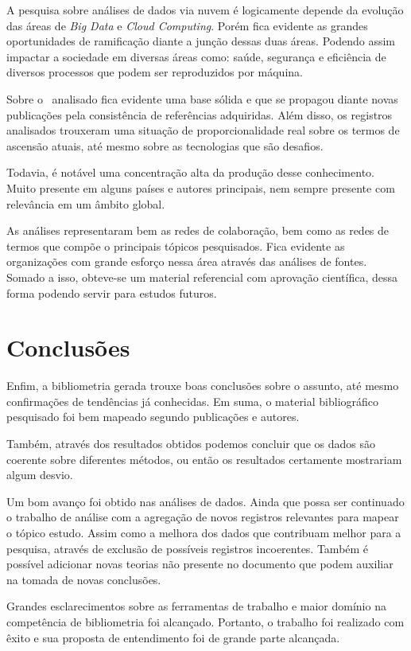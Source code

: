 A pesquisa sobre análises de dados via nuvem é logicamente depende da evolução das áreas de \textit{Big Data} e \textit{Cloud Computing}. Porém fica evidente as grandes oportunidades de ramificação diante a junção dessas duas áreas. Podendo assim impactar a sociedade em diversas áreas como: saúde, segurança e eficiência de diversos processos que podem ser reproduzidos por máquina.

Sobre o \dataset\ analisado fica evidente uma base sólida e que se propagou diante novas publicações pela consistência de referências adquiridas. Além disso, os registros analisados trouxeram uma situação de proporcionalidade real sobre os termos de ascensão atuais, até mesmo sobre as tecnologias que são desafios.

Todavia, é notável uma concentração alta da produção desse conhecimento. Muito presente em alguns países e autores principais, nem sempre presente com relevância em um âmbito global.

As análises representaram bem as redes de colaboração, bem como as redes de termos que compõe o principais tópicos pesquisados. Fica evidente as organizações com grande esforço nessa área através das análises de fontes. Somado a isso, obteve-se um material referencial com aprovação científica, dessa forma podendo servir para estudos futuros.

\section{Conclusões}

Enfim, a bibliometria gerada trouxe boas conclusões sobre o assunto, até mesmo confirmações de tendências já conhecidas. Em suma, o material bibliográfico pesquisado foi bem mapeado segundo publicações e autores.

Também, através dos resultados obtidos podemos concluir que os dados são coerente sobre diferentes métodos, ou então os resultados certamente mostrariam algum desvio.

Um bom avanço foi obtido nas análises de dados. Ainda que possa ser continuado o trabalho de análise com a agregação de novos registros relevantes para mapear o tópico estudo. Assim como a melhora dos dados que contribuam melhor para a pesquisa, através de exclusão de possíveis registros incoerentes. Também é possível adicionar novas teorias não presente no documento que podem auxiliar na tomada de novas conclusões.

Grandes esclarecimentos sobre as ferramentas de trabalho e maior domínio na competência de bibliometria foi alcançado. Portanto, o trabalho foi realizado com êxito e sua proposta de entendimento foi de grande parte alcançada.

